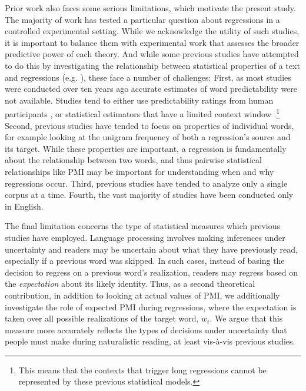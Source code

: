 \documentclass[12pt]{article}
\newcommand{\targetindex}{t}
\newcommand{\target}{$w_{\targetindex}$\xspace}
\begin{document}
Prior work also faces some serious limitations, which motivate the present study. The majority of work has tested a particular question about regressions in a controlled experimental setting. While we acknowledge the utility of such studies, it is important to balance them with experimental work that assesses the broader predictive power of each theory. And while some previous studies have attempted to do this by investigating the relationship between statistical properties of a text and regressions (e.g. \citet{vitu2000regressive, rayner2004effects, kliegl2004length, bicknell2011readers, lopopolo2019dependency}), these face a number of challenges: First, as most studies were conducted over ten years ago accurate estimates of word predictability were not available. Studies tend to either use predictability ratings from human participants \citep{rayner2004effects, kliegl2004length}, or statistical estimators that have a limited context window \citep{bicknell2011readers}.\footnote{This means that the contexts that trigger long regressions cannot be represented by these previous statistical models.} Second, previous studies have tended to focus on properties of individual words, for example looking at the unigram frequency of both a regression’s source and its target. While these properties are important, a regression is fundamentally about the relationship between two words, and thus pairwise statistical relationships like PMI may be important for understanding when and why regressions occur. Third, previous studies have tended to analyze only a single corpus at a time. Fourth, the vast majority of studies have been conducted only in English.

The final limitation concerns the type of statistical measures which previous studies have employed. Language processing involves making inferences under uncertainty \citep{kleinschmidt2015robust, bicknell2010rational} and readers may be uncertain about what they have previously read, especially if a previous word was skipped. In such cases, instead of basing the decision to regress on a previous word's realization, readers may regress based on the \textit{expectation} about its likely identity. Thus, as a second theoretical contribution, in addition to looking at actual values of PMI, we additionally investigate the role of expected PMI during regressions, where the expectation is taken over all possible realizations of the target word, \target. We argue that this measure more accurately reflects the types of decisions under uncertainty that people must make during naturalistic reading, at least vis-\`{a}-vis previous studies.
\end{document}
